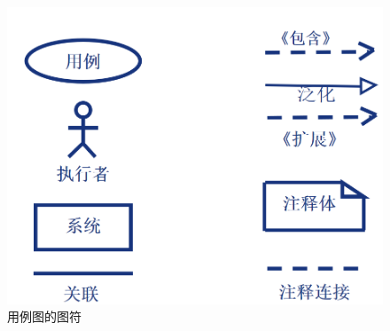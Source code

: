 \documentclass[UTF8,a4paper]{ctexart}
\begin{document}
\begin{figure}[H]
  \centering
  \includegraphics[scale = 0.3]{assets/SoftwareEngineering_ca369.png}
  \caption{用例图的图符}
\end{figure}
\end{document}
